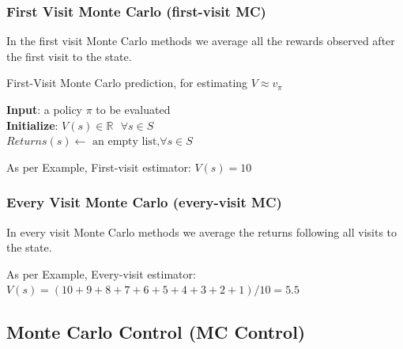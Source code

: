 \subsubsection{First Visit Monte Carlo (first-visit MC) \cite{medium/nerd-for-tech/monte-carlo-methods-for-reinforcement-learning-d30d874dd817}}

In the first visit Monte Carlo methods we average all the rewards observed after the first visit to the state.

\begin{algorithm}[h!]
    \caption{First-Visit Monte Carlo prediction, for estimating $V \approx v_\pi$}

    \textbf{Input}: a policy $\pi$ to be evaluated\\

    \textbf{Initialize}:
    $V(s) \in \mathbb{R} \text{ } \forall s \in S$\\
    $Returns(s) \leftarrow \text{ an empty list,} \forall s\in S$\\

\end{algorithm}


As per Example, First-visit estimator: $V(s) = 10$


\subsubsection{Every Visit Monte Carlo (every-visit MC) \cite{medium/nerd-for-tech/monte-carlo-methods-for-reinforcement-learning-d30d874dd817}}

In every visit Monte Carlo methods we average the returns following all visits to the state.


As per Example, Every-visit estimator: $V(s) = (10+9+8+7+6+5+4+3+2+1)/10 = 5.5$


\subsection{Monte Carlo Control (MC Control) \cite{medium/nerd-for-tech/monte-carlo-methods-for-reinforcement-learning-d30d874dd817}}

